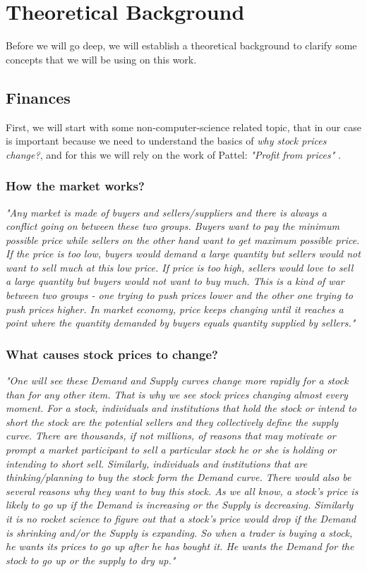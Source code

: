 \clearpage
\section{Theoretical Background}

Before we will go deep, we will establish a theoretical background to clarify some concepts that we will be using on this work. 

\subsection{Finances}

First, we will start with some non-computer-science related topic, that in our case is important because we need to understand the basics of \emph{why stock prices change?}, and for this we will rely on the work of Pattel: \emph{"Profit from prices"} \cite{P2007}.


 \subsubsection{How the market works?}
	\emph{"Any market is made of buyers and sellers/suppliers and there is always a conflict going on between these two groups. Buyers want to pay the minimum possible price while sellers on the other hand want to get maximum possible price. If the price is too low, buyers would demand a large quantity but sellers would not want to sell much at this low price. If price is too high, sellers would love to sell a large quantity but buyers would not want to buy much. This is a kind of war between two groups - one trying to push prices lower and the other one trying to push prices higher. In market economy, price keeps changing until it reaches a point where the quantity demanded by buyers equals quantity supplied by sellers."}

 \subsubsection{What causes stock prices to change?}
	\emph{"One will see these Demand and Supply curves change more rapidly for a stock than for any other item. That is why we see stock prices changing almost every moment. For a stock, individuals and institutions that hold the stock or intend to short the stock are the potential sellers and they collectively define the supply curve. There are thousands, if not millions, of reasons that may motivate or prompt a market participant to sell a particular stock he or she is holding or intending to short sell. Similarly, individuals and institutions that are thinking/planning to buy the stock form the Demand curve. There would also be several reasons why they want to buy this stock. As we all know, a stock’s price is likely to go up if the Demand is increasing or the Supply is decreasing. Similarly it is no rocket science to figure out that a stock’s price would drop if the Demand is shrinking and/or the Supply is expanding. So when a trader is buying a stock, he wants its prices to go up after he has bought it. He wants the Demand for the stock to go up or the supply to dry up."}
	
